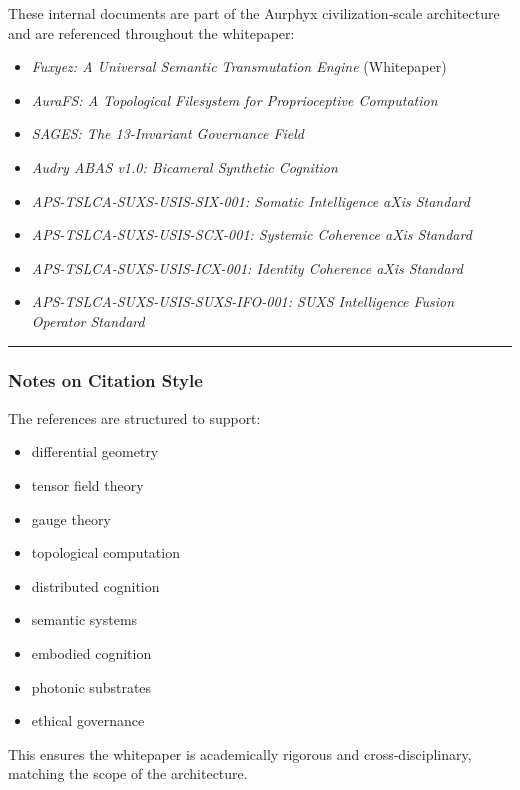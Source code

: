 These internal documents are part of the Aurphyx civilization‑scale architecture and are referenced throughout the whitepaper:

\begin{itemize}
\tightlist
\item
  \emph{Fuxyez: A Universal Semantic Transmutation Engine} (Whitepaper)
\item
  \emph{AuraFS: A Topological Filesystem for Proprioceptive Computation}
\item
  \emph{SAGES: The 13‑Invariant Governance Field}
\item
  \emph{Audry ABAS v1.0: Bicameral Synthetic Cognition}
\item
  \emph{APS-TSLCA-SUXS-USIS-SIX-001: Somatic Intelligence aXis Standard}
\item
  \emph{APS-TSLCA-SUXS-USIS-SCX-001: Systemic Coherence aXis Standard}
\item
  \emph{APS-TSLCA-SUXS-USIS-ICX-001: Identity Coherence aXis Standard}
\item
  \emph{APS-TSLCA-SUXS-USIS-SUXS-IFO-001: SUXS Intelligence Fusion Operator Standard}
\end{itemize}

\begin{center}\rule{0.5\linewidth}{0.5pt}\end{center}

\subsubsection{Notes on Citation Style}\label{notes-on-citation-style}

The references are structured to support:

\begin{itemize}
\tightlist
\item
  differential geometry\\
\item
  tensor field theory\\
\item
  gauge theory\\
\item
  topological computation\\
\item
  distributed cognition\\
\item
  semantic systems\\
\item
  embodied cognition\\
\item
  photonic substrates\\
\item
  ethical governance
\end{itemize}

This ensures the whitepaper is academically rigorous and cross‑disciplinary, matching the scope of the architecture.
